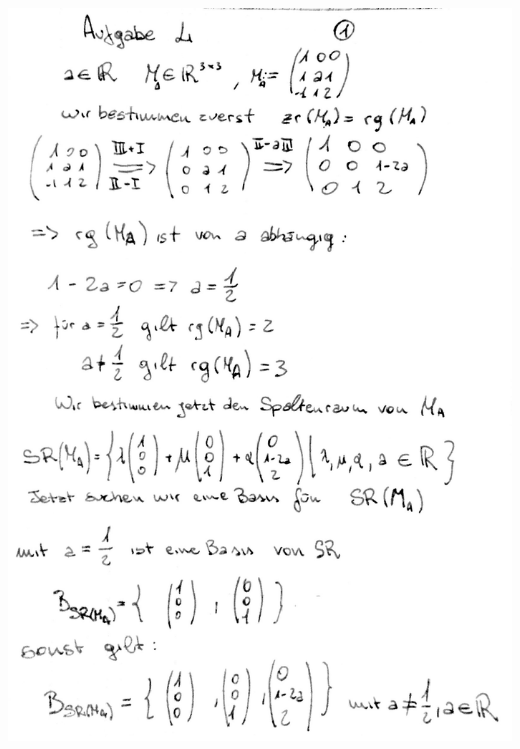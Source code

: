 \documentclass[10pt,a4paper]{article}
\begin{document}
\includegraphics[scale=0.25]{lat1_10.jpg} 
\end{document}
